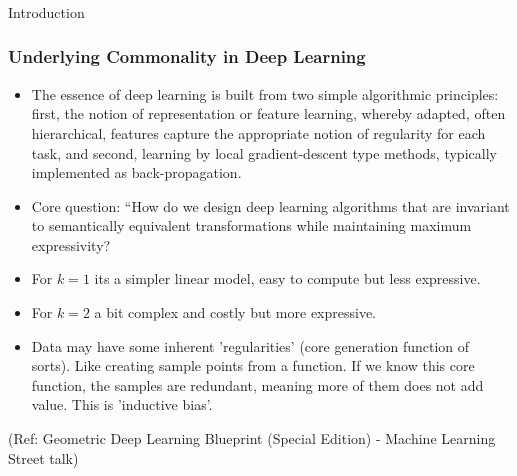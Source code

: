 \begin{frame}[fragile]\frametitle{}
\begin{center}
{\Large Introduction}
\end{center}
\end{frame}

\begin{frame}[fragile]\frametitle{Underlying Commonality in Deep Learning}


\begin{itemize}
\item The essence of deep learning is built from two simple algorithmic principles: first, the notion of representation or feature learning, whereby adapted, often hierarchical, features capture the appropriate notion of regularity for each task, and second, learning by local gradient-descent type methods, typically implemented as back-propagation.
\item Core question: ``How do we design deep learning algorithms that are invariant to semantically equivalent transformations while maintaining maximum expressivity?
\item For $k=1$ its a simpler linear model, easy to compute but less expressive.
\item For $k=2$ a bit complex and costly but more expressive.
\item Data may have some inherent 'regularities' (core generation function of sorts). Like creating sample points from a function. If we know this core function, the samples are redundant, meaning more of them does not add value. This is 'inductive bias'.
\end{itemize}
	  
{\tiny (Ref: Geometric Deep Learning Blueprint (Special Edition) - Machine Learning Street talk)}

\end{frame}

